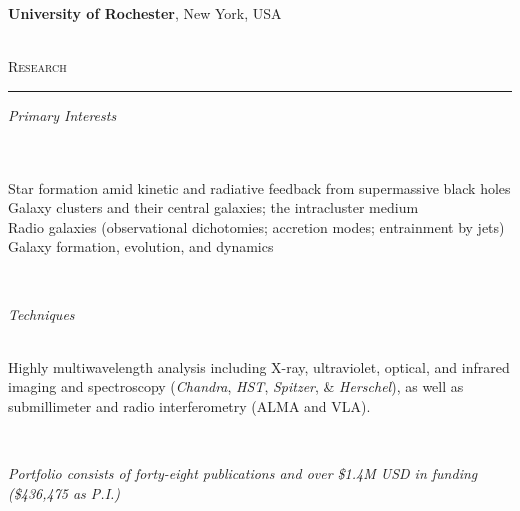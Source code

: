 \documentclass[11pt]{article}
\makeatletter
\def\vhrulefill#1{\leavevmode\leaders\hrule\@height#1\hfill \kern\z@}
\makeatother
\begin{document}
\hspace{42mm} \parbox{5.15in}{\textbf{University of Rochester}, New York, USA} \\



\textsc{Research}  \vhrulefill{0.4pt}

\vspace{4mm}

\hspace{2.5mm} \parbox{1.5in}{\textit{Primary Interests \\\\\\}} \parbox{5.15in}{Star formation amid kinetic and radiative feedback from supermassive black holes \\ Galaxy clusters and their central galaxies; the intracluster medium \\ Radio galaxies (observational dichotomies; accretion modes; entrainment by jets) \\ Galaxy formation, evolution, and dynamics  } \\


\vspace{4mm}

\hspace{2.5mm} \parbox{1.5in}{\textit{Techniques \\\\}} \parbox{5.15in}{Highly multiwavelength analysis including X-ray, ultraviolet, optical, and infrared imaging and spectroscopy (\textit{Chandra}, \textit{HST}, \textit{Spitzer}, \& \textit{Herschel}), as well as submillimeter and radio interferometry (ALMA and VLA).  } \\

\vspace*{-3mm}

\begin{center}
\textit{Portfolio consists of forty-eight publications and over \$1.4M USD in funding (\$436,475 as P.I.)}  \\
\end{center}


\clearpage
\end{document}

